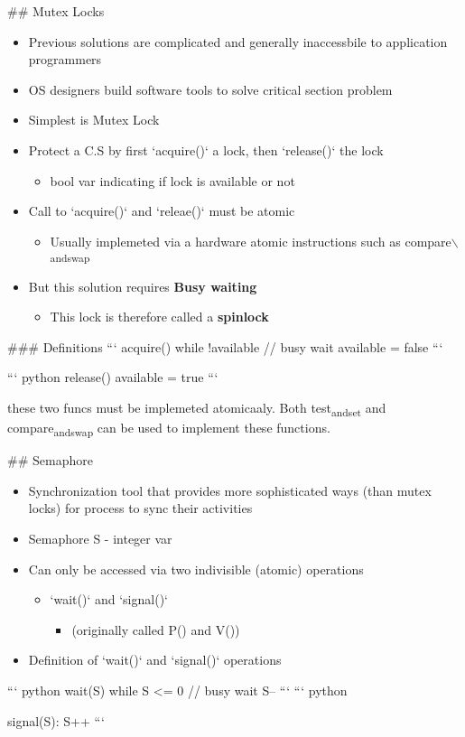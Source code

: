 \documentclass[11pt]{article}
\begin{document}
\#\# Mutex Locks
\begin{itemize}
\item Previous solutions are complicated and generally inaccessbile to application programmers
\item OS designers build software tools to solve critical section problem
\item Simplest is Mutex Lock
\item Protect a C.S by first `acquire()` a lock, then `release()` the lock
\begin{itemize}
\item bool var indicating if lock is available or not
\end{itemize}
\item Call to `acquire()` and `releae()` must be atomic
\begin{itemize}
\item Usually implemeted via a hardware atomic instructions such as compare$\backslash$\textsubscript{and}\textsubscript{swap}
\end{itemize}
\item But this solution requires \textbf{\textbf{Busy waiting}}
\begin{itemize}
\item This lock is therefore called a \textbf{\textbf{spinlock}}
\end{itemize}
\end{itemize}

\#\#\# Definitions 
```
acquire()
  while !available
    // busy wait
  available = false
```

``` python
release()
  available = true
```

these two funcs must be implemeted atomicaaly. Both test\textsubscript{and}\textsubscript{set} and compare\textsubscript{and}\textsubscript{swap} can be used to implement these functions.

\#\# Semaphore
\begin{itemize}
\item Synchronization tool that provides more sophisticated ways (than mutex locks) for process to sync their activities
\item Semaphore S - integer var
\item Can only be accessed via two indivisible (atomic) operations 
\begin{itemize}
\item `wait()` and `signal()`
\begin{itemize}
\item (originally called P() and V())
\end{itemize}
\end{itemize}
\item Definition of `wait()` and `signal()` operations
\end{itemize}
``` python
wait(S) 
  while S <= 0
    // busy wait
  S--
```
``` python

signal(S):
  S++
```
\end{document}
